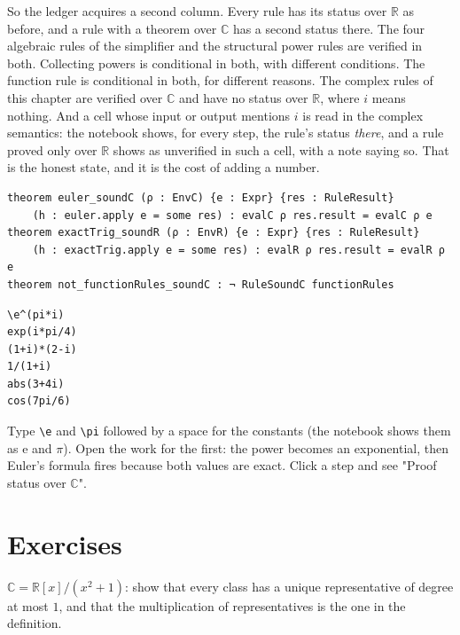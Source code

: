 So the ledger acquires a second column. Every rule has its status over $\mathbb{R}$ as before, and
a rule with a theorem over $\mathbb{C}$ has a second status there. The four algebraic rules of the
simplifier and the structural power rules are verified in both. Collecting powers is conditional
in both, with different conditions. The function rule is conditional in both, for different
reasons. The complex rules of this chapter are verified over $\mathbb{C}$ and have no status over
$\mathbb{R}$, where $i$ means nothing. And a cell whose input or output mentions $i$ is read in
the complex semantics: the notebook shows, for every step, the rule's status \emph{there}, and a
rule proved only over $\mathbb{R}$ shows as unverified in such a cell, with a note saying so.
That is the honest state, and it is the cost of adding a number.

\begin{verbatim}
theorem euler_soundC (ρ : EnvC) {e : Expr} {res : RuleResult}
    (h : euler.apply e = some res) : evalC ρ res.result = evalC ρ e
theorem exactTrig_soundR (ρ : EnvR) {e : Expr} {res : RuleResult}
    (h : exactTrig.apply e = some res) : evalR ρ res.result = evalR ρ e
theorem not_functionRules_soundC : ¬ RuleSoundC functionRules
\end{verbatim}

\begin{trybox}
\begin{verbatim}
\e^(pi*i)
exp(i*pi/4)
(1+i)*(2-i)
1/(1+i)
abs(3+4i)
cos(7pi/6)
\end{verbatim}
  Type \texttt{\textbackslash e} and \texttt{\textbackslash pi} followed by a space for the constants (the notebook shows them as $\mathrm{e}$ and $\pi$). Open the work
  for the first: the power becomes an exponential, then Euler's formula fires because both values
  are exact. Click a step and see "Proof status over $\mathbb{C}$".
\end{trybox}

\section{Exercises}

\begin{exercisebox}
  $\mathbb{C} = \mathbb{R}[x]/(x^2+1)$: show that every class has a unique representative of
  degree at most $1$, and that the multiplication of representatives is the one in the definition.
\end{exercisebox}


